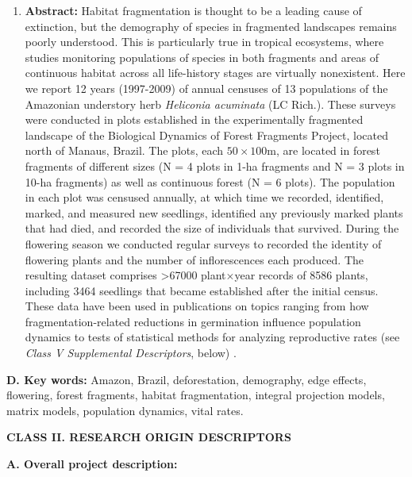 \documentclass[
  12pt,
  man, donotrepeattitle]{apa6}
\providecommand{\tightlist}{%
  \setlength{\itemsep}{0pt}\setlength{\parskip}{0pt}}
\begin{document}
\begin{enumerate}
\def\labelenumi{\arabic{enumi}.}
\setcounter{enumi}{1}
\tightlist
\item
  \textbf{Abstract:} Habitat fragmentation is thought to be a leading cause of extinction, but the demography of species in fragmented landscapes remains poorly understood. This is particularly true in tropical ecosystems, where studies monitoring populations of species in both fragments and areas of continuous habitat across all life-history stages are virtually nonexistent. Here we report 12 years (1997-2009) of annual censuses of 13 populations of the Amazonian understory herb \emph{Heliconia acuminata} (LC Rich.). These surveys were conducted in plots established in the experimentally fragmented landscape of the Biological Dynamics of Forest Fragments Project, located north of Manaus, Brazil. The plots, each \(50\times100\)m, are located in forest fragments of different sizes (N = 4 plots in 1-ha fragments and N = 3 plots in 10-ha fragments) as well as continuous forest (N = 6 plots). The population in each plot was censused annually, at which time we recorded, identified, marked, and measured new seedlings, identified any previously marked plants that had died, and recorded the size of individuals that survived. During the flowering season we conducted regular surveys to recorded the identity of flowering plants and the number of inflorescences each produced. The resulting dataset comprises \textgreater67000 plant\(\times\)year records of 8586 plants, including 3464 seedlings that became established after the initial census. These data have been used in publications on topics ranging from how fragmentation-related reductions in germination influence population dynamics to tests of statistical methods for analyzing reproductive rates (see \emph{Class V Supplemental Descriptors}, below) .
\end{enumerate}

\noindent
\textbf{D. Key words:} Amazon, Brazil, deforestation, demography, edge effects, flowering, forest fragments, habitat fragmentation, integral projection models, matrix models, population dynamics, vital rates.

\noindent 
\textbf{CLASS II. RESEARCH ORIGIN DESCRIPTORS}

\noindent  
\textbf{A. Overall project description:}
\end{document}
